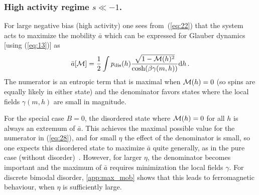 \documentclass{iopart}
\newcommand{\eqref}[1]{(\ref{#1})}
\newcommand{\dst}[0]{\ensuremath{\mathrm{d}}}
\newcommand{\mdis}[0]{\ensuremath{\mathcal{M}}}
\begin{document}
\fi

\subsubsection{High activity regime $s\ll -1$.}\label{sec:high_act}
For large negative bias (high activity) one sees from~\eqref{eq:22} that the system acts to maximize the mobility $\bar a$ 
which can be expressed for Glauber dynamics [using \eqref{eq:13}] as
\begin{equation}
  \label{eq:28}
  \bar{a}[\mm] = \frac{1}{2} \int \pdis(h) \frac{\sqrt{1-\mm(h)^{2}}}{\cosh(\beta \gamma(m,h) )} \dst h \, .
\end{equation}
The numerator is an entropic term that is maximal when ${\cal M}(h)=0$ (so spins are equally likely in either state) and the denominator favors states where the local fields $\gamma(m,h)$ are small in magnitude.

For the special case $B=0$, the disordered state where ${\cal M}(h)= 0$ for all $h$ is always an extremum of $\bar{a}$.
This achieves the maximal possible value for the numerator in \eqref{eq:28}, and for small $\eta$ the effect of the denominator is small, so one expects this disordered state to maximize $\bar a$ quite generally, as in the pure case (without disorder)~\cite{GuiothJack2020}.  However, for larger $\eta$, the denominator becomes important and the maximum of $\bar a$ requires minimization the local fields $\gamma$.  For discrete bimodal disorder, \ref{app:max_mob} shows that this leads to ferromagnetic behaviour, when $\eta$ is sufficiently large.
\end{document}
